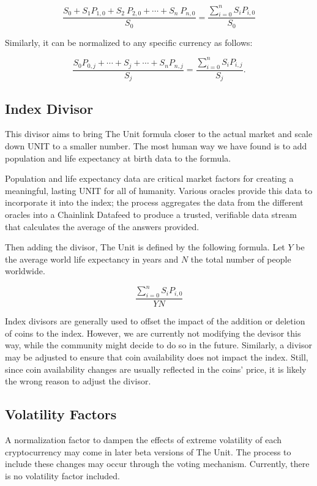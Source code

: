 \documentclass[12pt]{article}
\begin{document}
$$
\frac{S_0+S_1 P_{1,0}+ S_2\ P_{2,0}+\cdots+ S_n\ P_{n,0}}{S_0}= \frac{\displaystyle{\sum_{i=0}^{n} S_iP_{i,0}}}{S_0}
$$

Similarly, it can be normalized to any specific currency as follows:


$$
\frac{S_0P_{0,j}+\cdots+S_j+\cdots+S_nP_{n,j}}{S_j} = \frac{\displaystyle{\sum_{i=0}^{n} S_iP_{i,j}}}{S_j}.
$$


\subsection{Index Divisor}

This divisor aims to bring The Unit formula closer to the actual market and scale down UNIT to a smaller number. The most human way we have found is to add population and life expectancy at birth data to the formula.

Population and life expectancy data are critical market factors for creating a meaningful, lasting UNIT for all of humanity. Various oracles provide this data to incorporate it into the index; the process aggregates the data from the different oracles into a Chainlink Datafeed to produce a trusted, verifiable data stream that calculates the average of the answers provided. 


Then adding the divisor, The Unit is defined by the following formula. Let $Y$ be the average world life expectancy in years and $N$ the total number of people worldwide. 

$$
\frac{\displaystyle{\sum_{i=0}^{n} S_iP_{i,0}}}{Y N}
$$

Index divisors are generally used to offset the impact of the addition or deletion of coins to the index. However, we are currently not modifying the devisor this way, while the community might decide to do so in the future. Similarly, a divisor may be adjusted to ensure that coin availability does not impact the index. Still, since coin availability changes are usually reflected in the coins' price, it is likely the wrong reason to adjust the divisor.

\subsection{Volatility Factors}

A normalization factor to dampen the effects of extreme volatility of each cryptocurrency may come in later beta versions of The Unit. The process to include these changes may occur through the voting mechanism. Currently, there is no volatility factor included.
\end{document}
